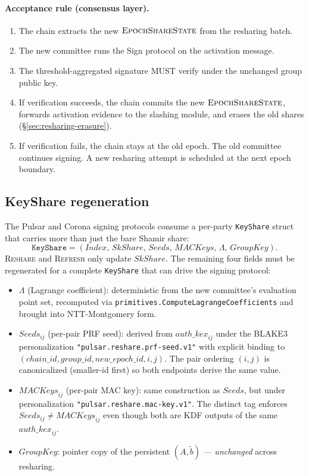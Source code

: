 \paragraph{Acceptance rule (consensus layer).}
\begin{enumerate}
\item The chain extracts the new $\textsc{EpochShareState}$ from the resharing batch.
\item The new committee runs the Sign protocol on the activation message.
\item The threshold-aggregated signature MUST verify under the unchanged group public key.
\item If verification succeeds, the chain commits the new $\textsc{EpochShareState}$, forwards activation evidence to the slashing module, and erases the old shares (\S\ref{sec:resharing-erasure}).
\item If verification fails, the chain stays at the old epoch. The old committee continues signing. A new resharing attempt is scheduled at the next epoch boundary.
\end{enumerate}

\subsection{KeyShare regeneration}
\label{sec:resharing-keyshare}

The Pulsar and Corona signing protocols consume a per-party \texttt{KeyShare} struct that carries more than just the bare Shamir share:
\[
  \texttt{KeyShare} = (\mathit{Index},\, \mathit{SkShare},\, \mathit{Seeds},\, \mathit{MACKeys},\, \Lambda,\, \mathit{GroupKey}).
\]
\textsc{Reshare} and \textsc{Refresh} only update $\mathit{SkShare}$. The remaining four fields must be regenerated for a complete \texttt{KeyShare} that can drive the signing protocol:

\begin{itemize}
\item $\Lambda$ (Lagrange coefficient): deterministic from the new committee's evaluation point set, recomputed via \texttt{primitives.ComputeLagrangeCoefficients} and brought into NTT-Montgomery form.

\item $\mathit{Seeds}_{ij}$ (per-pair PRF seed): derived from $\mathit{auth\_kex}_{ij}$ under the BLAKE3 personalization \texttt{"pulsar.reshare.prf-seed.v1"} with explicit binding to $(\mathit{chain\_id}, \mathit{group\_id}, \mathit{new\_epoch\_id}, i, j)$. The pair ordering $(i, j)$ is canonicalized (smaller-id first) so both endpoints derive the same value.

\item $\mathit{MACKeys}_{ij}$ (per-pair MAC key): same construction as $\mathit{Seeds}$, but under personalization \texttt{"pulsar.reshare.mac-key.v1"}. The distinct tag enforces $\mathit{Seeds}_{ij} \neq \mathit{MACKeys}_{ij}$ even though both are KDF outputs of the same $\mathit{auth\_kex}_{ij}$.

\item $\mathit{GroupKey}$: pointer copy of the persistent $(A, \tilde b)$ --- \emph{unchanged} across resharing.
\end{itemize}

